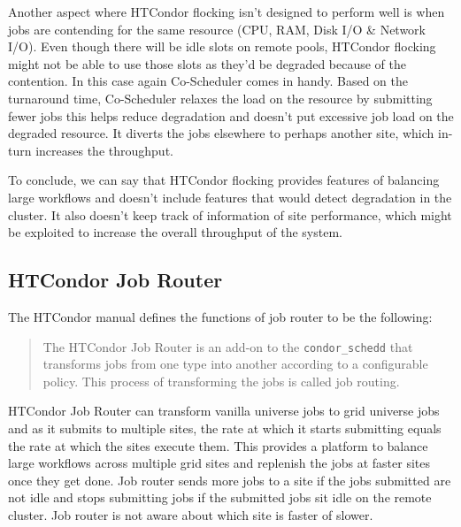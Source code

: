 \documentclass[ms,electronic,double]{nuthesis}
\begin{document}
Another aspect where HTCondor flocking isn't designed to perform well is when jobs are 
contending for the same resource (CPU, RAM, Disk I/O \& Network I/O). Even though there will be 
idle slots on remote pools, HTCondor flocking might not be able to use those 
slots as they'd be degraded because of the contention. In this case again 
Co-Scheduler comes in handy. Based on the turnaround time, Co-Scheduler relaxes the load on the resource by submitting fewer  jobs 
this helps reduce degradation and doesn't put excessive job load on the 
degraded resource. It diverts the jobs elsewhere to perhaps another site, which in-turn increases the 
throughput.

To conclude, we can say that HTCondor flocking provides features of balancing 
large workflows and doesn't include features that would detect degradation in 
the cluster. It also doesn't keep track of information of site performance, which might be exploited to increase the overall throughput of the system. 

\subsection{HTCondor Job Router}

The HTCondor manual defines the functions of job router to be the following:
\begin{quotation}

The HTCondor Job Router is an add-on to the \texttt{condor\_schedd} that transforms jobs from one type into 
another according to a configurable policy\cite{manual56}. 
This process of transforming the jobs is called job routing.
\end{quotation}

HTCondor Job Router can transform vanilla universe jobs to grid universe jobs and 
as it submits to multiple sites, the rate at which it starts submitting equals 
the rate at which the sites execute them. This provides a platform to balance large 
workflows across multiple grid sites and replenish the jobs at
faster sites once they get done. Job router sends more jobs to a site if 
the jobs submitted are not idle and stops submitting jobs if the submitted jobs 
sit idle on the remote cluster. Job router is not aware about which site is 
faster of slower.
\end{document}
